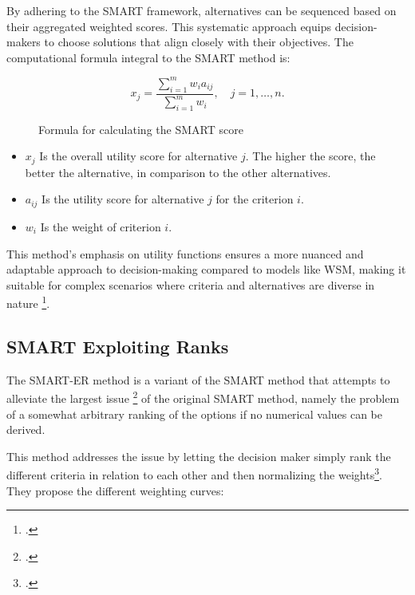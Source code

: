 By adhering to the \ac{SMART} framework, alternatives can be sequenced based on
their aggregated weighted scores. This systematic approach equips
decision-makers to choose solutions that align closely with their objectives.
The computational formula integral to the \ac{SMART} method is:

\begin{figure}[h]
    \centering
    \Large
    \[ x_j = \frac{\sum_{i=1}^{m} w_i a_{ij}}{\sum_{i=1}^{m} w_i}, \quad j = 1, \ldots, n. \]
    \caption{Formula for calculating the \ac*{SMART} score\protect\footnotemark} 
\end{figure}


\begin{itemize}
    \item \( x_j \) Is the overall utility score for alternative \( j \). The higher the score, the better the alternative, in comparison to the other alternatives.
    \item \( a_{ij} \)  Is the utility score for alternative \( j \) for the criterion \( i \).
    \item \( w_i \) Is the weight of criterion \( i \).
\end{itemize}

This method's emphasis on utility functions ensures a more nuanced and adaptable
approach to decision-making compared to models like WSM, making it suitable for
complex scenarios where criteria and alternatives are diverse in nature \footcite[p. 6]{fulopIntroductionDecisionMaking2005}.

\subsection{SMART Exploiting Ranks}
\label{smart_er}

The \ac{SMART-ER} method is a variant of the \ac{SMART} method that attempts to alleviate the largest issue \footcitetext[p. 26]{barfodMulticriteriaDecisionAnalysis2014} of the original \ac{SMART} method, 
namely the problem of a somewhat arbitrary ranking of the options if no numerical values can be derived.

This method addresses the issue by letting the decision maker simply rank the different criteria in relation to each other and then normalizing the weights\footcite[p. 296]{robertsWeightApproximationsMultiattribute2002a}.
They propose the different weighting curves:

